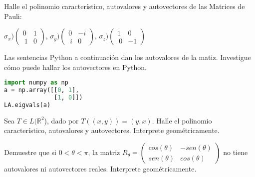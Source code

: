 \begin{exercise} 
 \item

Halle el polinomio característico, autovalores y autovectores de las Matrices de Pauli:

\bigskip

$\sigma_x) \left(\begin{array}{cc}0 & 1\\\ 1 & 0
\end{array}
 \right)$, \quad
 $\sigma_y) \left(\begin{array}{cc}0& -i\\\ i& 0
\end{array}
 \right)$, \quad
 $\sigma_z) \left(\begin{array}{cc}1 & 0 \\\ 0 & -1
\end{array}
 \right)$

 \bigskip

\bigskip
\noindent
Las sentencias Python a continuación dan los autovalores de la matiz. Investigue cómo puede hallar los autovectores en Python.

\begin{lstlisting}[language = python, numbers = none, escapechar = !,
    basicstyle = \ttfamily\bfseries, linewidth = 1\linewidth] 
import numpy as np
a = np.array([[0, 1],
              [1, 0]])
LA.eigvals(a)
\end{lstlisting} 
  
\bigskip
\end{exercise}
\begin{exercise} 
\item
Sea $T \in L(\mathbb{R}^2$), dado por $T((x,y))=(y,x)$. Halle el polinomio característico, autovalores y autovectores. Interprete geométricamente.
\end{exercise}

\bigskip

\begin{exercise} 
\item
Demuestre  que si $ 0 < \theta < \pi$, la matriz $R_{\theta}=\left(\begin{array}{cc}cos(\theta) & -sen(\theta) \\sen(\theta) & cos(\theta)
\end{array}
 \right)$
no tiene autovalores ni autovectores reales. Interprete geométricamente.
\end{exercise} 

